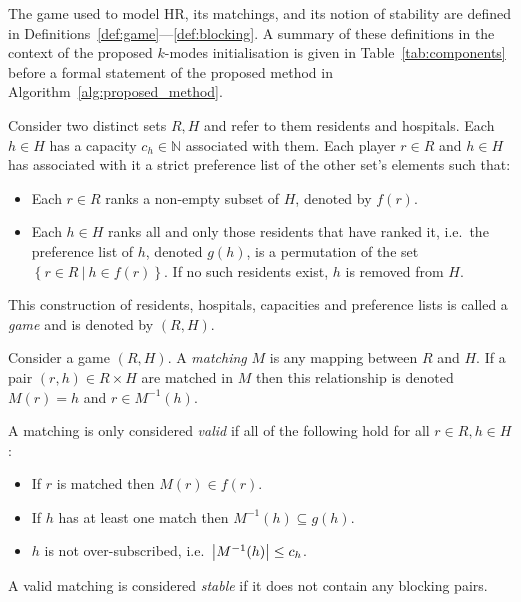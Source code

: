 \documentclass[smallextended]{svjour3}
\DeclarePairedDelimiter\abs{\lvert}{\rvert}%
\begin{document}
The game used to model HR, its matchings, and its notion of stability are
defined in Definitions~\ref{def:game}---\ref{def:blocking}. A summary of these
definitions in the context of the proposed \(k\)-modes initialisation is given
in Table~\ref{tab:components} before a formal statement of the proposed method
in Algorithm~\ref{alg:proposed_method}.

\begin{definition}\label{def:game}
    Consider two distinct sets \(R, H\) and refer to them residents and
    hospitals. Each \(h \in H\) has a capacity \(c_h \in \mathbb{N}\) associated
    with them. Each player \(r \in R\) and \(h \in H\) has associated 
    with it a strict preference list of the other set's elements such that:
    \begin{itemize}
        \item Each \(r \in R\) ranks a non-empty subset of \(H\), denoted by
            \(f(r)\).
        \item Each \(h \in H\) ranks all and only those residents that have
            ranked it, i.e.\ the preference list of \(h\), denoted \(g(h)\), is
            a permutation of the set
            \(\left\{r \in R \ | \ h \in f(r)\right\}\). If no such residents
            exist, \(h\) is removed from \(H\).
    \end{itemize}

    This construction of residents, hospitals, capacities and preference lists
    is called a \emph{game} and is denoted by \((R, H)\).
\end{definition}

\begin{definition}\label{def:matching}
    Consider a game \((R, H)\). A \emph{matching} \(M\) is any mapping between
    \(R\) and \(H\). If a pair \((r, h) \in R \times H\) are matched in \(M\)
    then this relationship is denoted \(M(r) = h\) and \(r \in M^{-1}(h)\).

    A matching is only considered \emph{valid} if all of the following hold for
    all \(r \in R, h \in H\):
    \begin{itemize}
        \item If \(r\) is matched then \(M(r) \in f(r)\).
        \item If \(h\) has at least one match then \(M^{-1}(h) \subseteq g(h)\).
        \item \(h\) is not over-subscribed, i.e.\ \(\abs*{M^{-1}(h)} \leq c_h\).
    \end{itemize}

    A valid matching is considered \emph{stable} if it does not contain any
    blocking pairs.
\end{definition}
\end{document}

